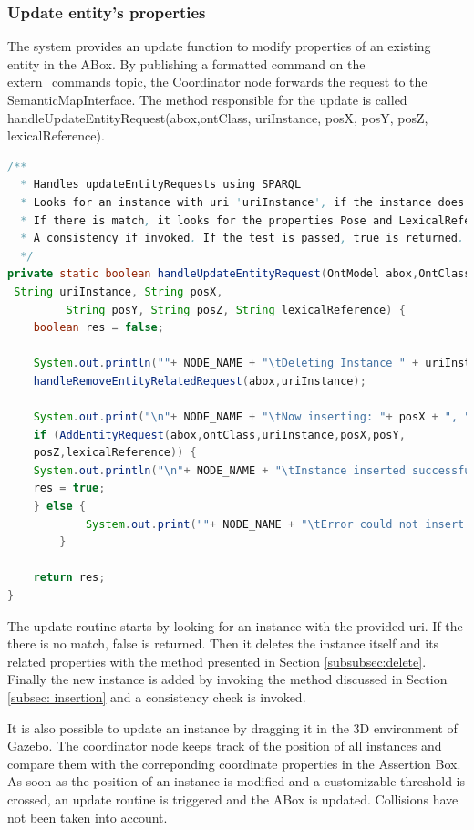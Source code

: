\subsubsection{Update entity's properties}
The system provides an update function to modify properties of an existing entity in the ABox. By publishing a formatted command on the extern\_commands topic, the Coordinator node forwards the request to the SemanticMapInterface. The method responsible for the update is called handleUpdateEntityRequest(abox,ontClass, uriInstance, posX, posY, posZ,  lexicalReference).

\begin{lstlisting}[language=Java]
/**
  * Handles updateEntityRequests using SPARQL
  *	Looks for an instance with uri 'uriInstance', if the instance does not exist returns flase.
  * If there is match, it looks for the properties Pose and LexicalReference and updates it. 
  * A consistency if invoked. If the test is passed, true is returned. Otherwise False.
  */
private static boolean handleUpdateEntityRequest(OntModel abox,OntClass ontClass,
 String uriInstance, String posX,
		 String posY, String posZ, String lexicalReference) {
	boolean res = false;

	System.out.println(""+ NODE_NAME + "\tDeleting Instance " + uriInstance);
	handleRemoveEntityRelatedRequest(abox,uriInstance);

	System.out.print("\n"+ NODE_NAME + "\tNow inserting: "+ posX + ", " + posY + " , " + posZ);
	if (AddEntityRequest(abox,ontClass,uriInstance,posX,posY,
	posZ,lexicalReference)) {
	System.out.println("\n"+ NODE_NAME + "\tInstance inserted successfully");
	res = true;
   	} else {
    		System.out.print(""+ NODE_NAME + "\tError could not insert instance consistency problem");
    	}
	
	return res;
}
\end{lstlisting}

The update routine starts by looking for an instance with the provided uri. If the there is no match, false is returned. Then it deletes the instance itself and its related properties with the method presented in Section \ref{subsubsec:delete}. Finally the new instance is added by invoking the method discussed in Section \ref{subsec: insertion} and a consistency check is invoked. 

It is also possible to update an instance by dragging it in the 3D environment of Gazebo. The coordinator node keeps track of the position of all instances and compare them with the correponding coordinate properties in the Assertion Box. As soon as the position of an instance is modified and a customizable threshold is crossed, an update routine is triggered and the ABox is updated. Collisions have not been taken into account.

